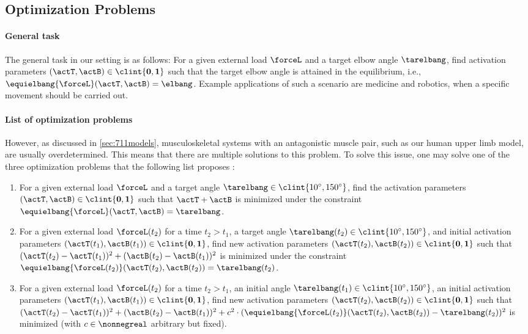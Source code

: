 \subsection{Optimization Problems}
\label{sec:722optimization}

\paragraph{General task}

The general task in our setting is as follows:
For a given external load $\forceL$ and a target elbow angle $\tarelbang$,
find activation parameters $(\actT, \actB) \in \clint{\*0, \*1}$
such that the target elbow angle is attained in the equilibrium,
i.e., $\equielbang{\forceL}(\actT,\actB) = \elbang$.
Example applications of such a scenario are medicine and robotics,
when a specific movement should be carried out.

\paragraph{List of optimization problems}

However, as discussed in \cref{sec:711models},
musculoskeletal systems with an antagonistic muscle pair,
such as our human upper limb model, are usually overdetermined.
This means that there are multiple solutions to this problem.
To solve this issue, one may solve one of the three
optimization problems that the following list proposes
\cite{Valentin18Gradient}:

\begin{enumerate}[label=O\arabic*.,leftmargin=2.7em]
  \item
  For a given external load $\forceL$ and a target angle
  $\tarelbang \in \clint{\ang{10}, \ang{150}}$,
  find the activation parameters $(\actT, \actB) \in \clint{\*0, \*1}$
  such that $\actT + \actB$ is minimized under the constraint
  $\equielbang{\forceL}(\actT, \actB) = \tarelbang$.
  
  \item
  For a given external load $\forceL(t_2)$ for a time $t_2 > t_1$,
  a target angle $\tarelbang(t_2) \in \clint{\ang{10}, \ang{150}}$,
  and initial activation parameters
  $(\actT(t_1), \actB(t_1)) \in \clint{\*0, \*1}$,
  find new activation parameters
  $(\actT(t_2), \actB(t_2)) \in \clint{\*0, \*1}$ such that
  $(\actT(t_2) - \actT(t_1))^2 + (\actB(t_2) - \actB(t_1))^2$
  is minimized under the constraint
  $\equielbang{\forceL(t_2)}(\actT(t_2), \actB(t_2)) = \tarelbang(t_2)$.
  
  \item
  For a given external load $\forceL(t_2)$ for a time $t_2 > t_1$,
  an initial angle $\tarelbang(t_1) \in \clint{\ang{10}, \ang{150}}$,
  an initial activation parameters
  $(\actT(t_1), \actB(t_1)) \in \clint{\*0, \*1}$,
  find new activation parameters
  $(\actT(t_2), \actB(t_2)) \in \clint{\*0, \*1}$ such that
  $(\actT(t_2) - \actT(t_1))^2 + (\actB(t_2) - \actB(t_1))^2 +
  c^2 \cdot (
    \equielbang{\forceL(t_2)}(\actT(t_2), \actB(t_2)) - \tarelbang(t_2)
  )^2$ is minimized (with $c \in \nonnegreal$ arbitrary but fixed).
\end{enumerate}

